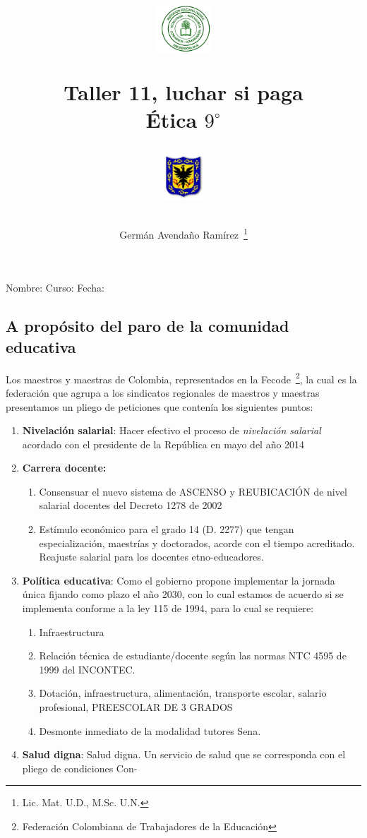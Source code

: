 \documentclass[letterpaper,11pt,twoside]{article}
\author{Germ\'an Avenda\~no Ram\'irez~\thanks{Lic. Mat. U.D., M.Sc. U.N.}}
\title{\begin{minipage}{.2\textwidth}
\includegraphics[height=1.75cm]{Images/logo-colegio.png}\end{minipage}
\begin{minipage}{.55\textwidth}
\begin{center}
Taller 11, luchar si paga\\
Ética $9^{\circ}$
\end{center}
\end{minipage}\hfill
\begin{minipage}{.2\textwidth}
\includegraphics[height=1.75cm]{Images/logo-sed.png} 
\end{minipage}}
\date{}
\begin{document}
\maketitle
Nombre: \hrulefill Curso: \underline{\hspace*{44pt}} Fecha: \underline{\hspace*{2.5cm}}
\begin{multicols}{2}
 \section*{A propósito del paro de la comunidad educativa}
 Los maestros y maestras de Colombia, representados en la Fecode~\footnote{Federación Colombiana de Trabajadores de la Educación}, la cual es la federación que agrupa a los sindicatos regionales de maestros y maestras presentamos un pliego de peticiones que contenía los siguientes puntos:
 \begin{enumerate}
 \item \textbf{Nivelación salarial}: Hacer efectivo el proceso de \emph{nivelación salarial} acordado con el presidente de la República en mayo del año 2014
 \item \textbf{Carrera docente:} 
 \begin{enumerate}
 \item  Consensuar el nuevo sistema de ASCENSO y REUBICACIÓN de nivel salarial docentes del Decreto 1278 de 2002
 \item Estímulo económico para el grado 14 (D. 2277) que tengan especialización, maestrías y doctorados, acorde con el tiempo acreditado. Reajuste salarial para los docentes etno-educadores.
\end{enumerate}  
 \item \textbf{Política educativa}: Como el gobierno propone implementar la jornada única fijando como plazo el año 2030, con lo cual estamos de acuerdo si se implementa conforme a la ley 115 de 1994, para lo cual se requiere:
 \begin{enumerate}
 \item Infraestructura
 \item Relación técnica de estudiante/docente según las normas NTC 4595 de 1999 del INCONTEC.
\item Dotación, infraestructura, alimentación, transporte escolar, salario profesional, PREESCOLAR DE 3 GRADOS
\item Desmonte inmediato de la modalidad tutores Sena.
 \end{enumerate}
 \item \textbf{Salud digna}: Salud digna. Un servicio de salud que se corresponda con el pliego de condiciones Con-

\end{enumerate}
\end{multicols}
\end{document}
